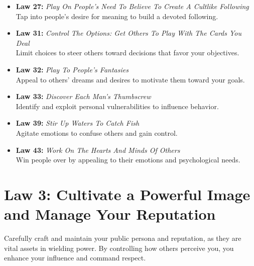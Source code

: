 \documentclass[a4paper,10.8pt]{article}
\begin{document}
\begin{itemize}[leftmargin=*, label={--}]
    \item \textbf{Law 27:} \textit{Play On People's Need To Believe To Create A Cultlike Following} \\
    Tap into people's desire for meaning to build a devoted following.
    
    \item \textbf{Law 31:} \textit{Control The Options: Get Others To Play With The Cards You Deal} \\
    Limit choices to steer others toward decisions that favor your objectives.
    
    \item \textbf{Law 32:} \textit{Play To People's Fantasies} \\
    Appeal to others' dreams and desires to motivate them toward your goals.
    
    \item \textbf{Law 33:} \textit{Discover Each Man's Thumbscrew} \\
    Identify and exploit personal vulnerabilities to influence behavior.
    
    \item \textbf{Law 39:} \textit{Stir Up Waters To Catch Fish} \\
    Agitate emotions to confuse others and gain control.
    
    \item \textbf{Law 43:} \textit{Work On The Hearts And Minds Of Others} \\
    Win people over by appealing to their emotions and psychological needs.
\end{itemize}

\clearpage

\section*{Law 3: Cultivate a Powerful Image and Manage Your Reputation}
Carefully craft and maintain your public persona and reputation, as they are vital assets in wielding power. By controlling how others perceive you, you enhance your influence and command respect.
\end{document}
